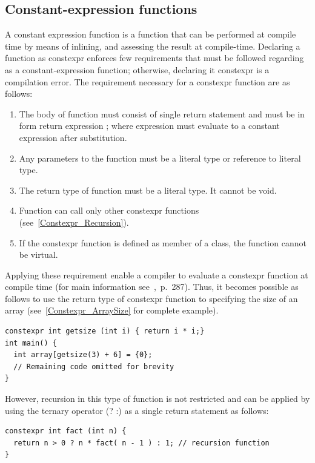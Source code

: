 \documentclass[11pt]{report}
\begin{document}
\subsection{Constant-expression functions}
\label{Constant Expression Functions}
A constant expression function is a function that can be performed at compile time by means of inlining, and assessing the result at compile-time. Declaring a function as constexpr enforces few requirements that must be followed regarding as a constant-expression function; otherwise, declaring it constexpr is a compilation error. The requirement necessary for a constexpr function are as follows:

\begin{enumerate}
\item The body of function must consist of single return statement and must be in form {return expression ;} where expression must evaluate to a constant expression after substitution.

\item Any parameters to the function must be a literal type or reference to literal type.

\item The return type of function must be a literal type. It cannot be void.

\item Function can call only other constexpr functions (see~\ref{Constexpr_Recursion}).

\item If the constexpr function is defined as member of a class, the function cannot be virtual.
\end{enumerate}
Applying these requirement enable a compiler to evaluate a constexpr function at compile time (for main information see~\cite{Gregorie:professionalcpp},~p.~287). Thus, it becomes possible as follows to use the return type of constexpr function to specifying the size of an array (see~\ref{Constexpr_ArraySize} for complete example).
\begin{lstlisting}
constexpr int getsize (int i) { return i * i;}
int main() {
  int array[getsize(3) + 6] = {0};
  // Remaining code omitted for brevity
}
\end{lstlisting}
However, recursion in this type of function is not restricted and can be applied by using the ternary operator (? :) as a single return statement as follows:
\begin{lstlisting}
constexpr int fact (int n) {
  return n > 0 ? n * fact( n - 1 ) : 1; // recursion function
}
\end{lstlisting}
\end{document}
